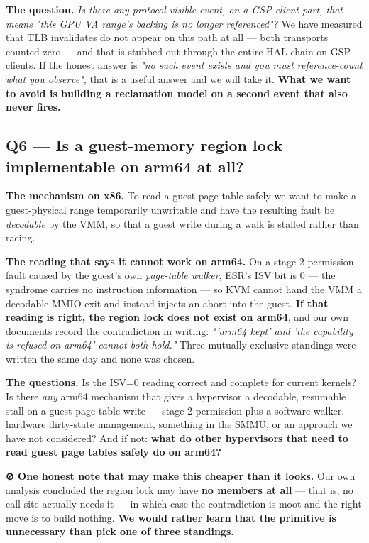 \documentclass[10.5pt]{article}
\begin{document}
\textbf{The question.} \emph{Is there any protocol-visible event, on a GSP-client part, that means
"this GPU VA range's backing is no longer referenced"?} We have measured that TLB invalidates do
not appear on this path at all — both transports counted zero — and that 
is stubbed out through the entire HAL chain on GSP clients. If the honest answer is \emph{"no such
event exists and you must reference-count what you observe"}, that is a useful answer and we will
take it. \textbf{What we want to avoid is building a reclamation model on a second event that also
never fires.}

\subsection*{Q6 --- Is a guest-memory region lock implementable on arm64 at all?}

\textbf{The mechanism on x86.} To read a guest page table safely we want to make a guest-physical
range temporarily unwritable and have the resulting fault be \emph{decodable} by the VMM, so that
a guest write during a walk is stalled rather than racing.

\textbf{The reading that says it cannot work on arm64.} On a stage-2 permission fault caused by
the guest's own \emph{page-table walker}, ESR's ISV bit is 0 — the syndrome carries no instruction
information — so KVM cannot hand the VMM a decodable MMIO exit and instead injects an abort into
the guest. \textbf{If that reading is right, the region lock does not exist on arm64}, and our own
documents record the contradiction in writing: \emph{"'arm64 kept' and 'the capability is refused
on arm64' cannot both hold."} Three mutually exclusive standings were written the same day and
none was chosen.

\textbf{The questions.} Is the ISV=0 reading correct and complete for current kernels? Is there
\emph{any} arm64 mechanism that gives a hypervisor a decodable, resumable stall on a
guest-page-table write — stage-2 permission plus a software walker, hardware dirty-state
management, something in the SMMU, or an approach we have not considered? And if not:
\textbf{what do other hypervisors that need to read guest page tables safely do on arm64?}

\textbf{⊘ One honest note that may make this cheaper than it looks.} Our own analysis concluded
the region lock may have \textbf{no members at all} — that is, no call site actually needs it — in
which case the contradiction is moot and the right move is to build nothing. \textbf{We would
rather learn that the primitive is unnecessary than pick one of three standings.}
\end{document}
